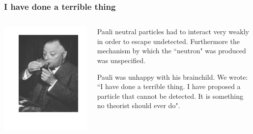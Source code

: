 \begin{frame}
\frametitle{I have done a terrible thing}

\begin{columns}
\includegraphics[scale=0.3]{img/pauli.png}
 
\begin{block}{}
Pauli neutral particles had to interact very weakly in order to escape undetected. Furthermore the mechanism by which the ``neutron" was produced was unspecified.

\vspace{0.5cm}

Pauli was unhappy with his brainchild. We wrote: ``I have  done a terrible thing. I have proposed a particle that cannot be detected. It is something no theorist should ever do". 

\end{block}
\end{columns}
\end{frame}

